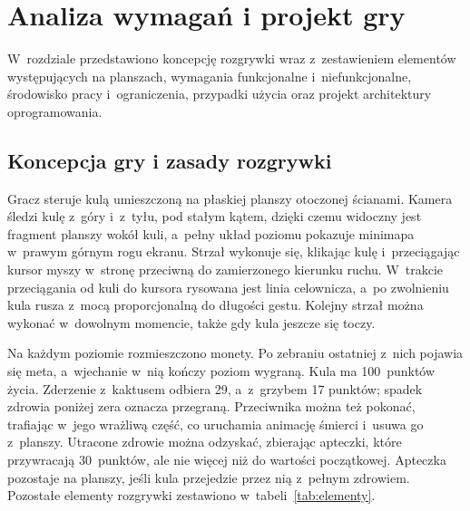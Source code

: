 \chapter{Analiza wymagań i projekt gry}
\label{rozdz:projekt}

W~rozdziale przedstawiono koncepcję rozgrywki wraz z~zestawieniem elementów występujących
na planszach, wymagania funkcjonalne i~niefunkcjonalne, środowisko pracy i~ograniczenia,
przypadki użycia oraz projekt architektury oprogramowania.

\section{Koncepcja gry i zasady rozgrywki}

Gracz steruje kulą umieszczoną na płaskiej planszy otoczonej ścianami. Kamera śledzi kulę
z~góry i~z~tyłu, pod stałym kątem, dzięki czemu widoczny jest fragment planszy wokół kuli,
a~pełny układ poziomu pokazuje minimapa w~prawym górnym rogu ekranu. Strzał wykonuje się,
klikając kulę i~przeciągając kursor myszy w~stronę przeciwną do zamierzonego
kierunku ruchu. W~trakcie przeciągania od kuli do kursora rysowana jest linia celownicza,
a~po zwolnieniu kula rusza z~mocą proporcjonalną do długości gestu. Kolejny strzał można
wykonać w~dowolnym momencie, także gdy kula jeszcze się toczy.

Na każdym poziomie rozmieszczono monety. Po zebraniu ostatniej z~nich pojawia się meta,
a~wjechanie w~nią kończy poziom wygraną. Kula ma 100~punktów życia. Zderzenie z~kaktusem
odbiera 29, a~z~grzybem 17 punktów; spadek zdrowia poniżej zera oznacza przegraną.
Przeciwnika można też pokonać, trafiając w~jego wrażliwą część, co uruchamia animację
śmierci i~usuwa go z~planszy. Utracone zdrowie można odzyskać, zbierając apteczki,
które przywracają 30~punktów, ale nie więcej niż do wartości początkowej. Apteczka
pozostaje na planszy, jeśli kula przejedzie przez nią z~pełnym zdrowiem. Pozostałe elementy
rozgrywki zestawiono w~tabeli~\ref{tab:elementy}.

